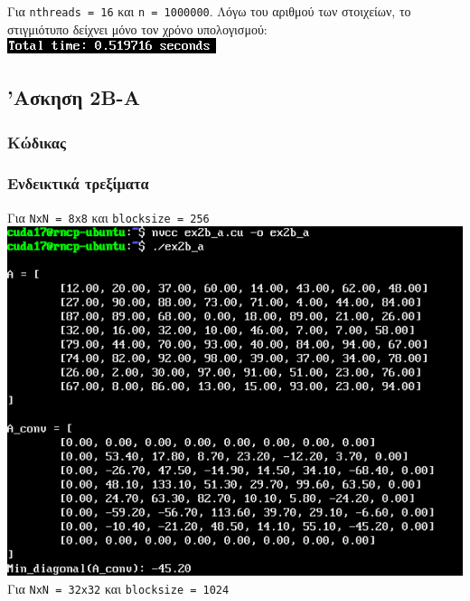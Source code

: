 \documentclass{article}
\begin{document}
Για \lstinline{nthreads = 16} και \lstinline{n = 1000000}. Λόγω του αριθμού των
στοιχείων, το στιγμιότυπο δείχνει μόνο τον χρόνο υπολογισμού: \\

\includegraphics[width=\textwidth]{res/ex2a_3.png} \\
\pagebreak

\subsection{'Ασκηση 2Β-Α}

\subsubsection{Κώδικας}

\pagebreak
\subsubsection{Ενδεικτικά τρεξίματα}

Για \lstinline{NxN = 8x8} και \lstinline{blocksize = 256} \\

\includegraphics[width=\textwidth]{res/ex2b_a_1.png} \\

Για \lstinline{NxN = 32x32} και \lstinline{blocksize = 1024} \\
\end{document}
